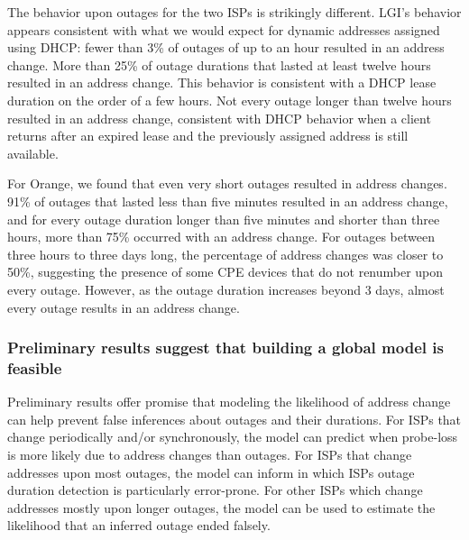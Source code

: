 The behavior upon outages for the two ISPs is strikingly
different. LGI's behavior appears consistent with what we would 
expect for dynamic addresses assigned using DHCP: fewer than
3\% of outages of up to an hour resulted in an address
change.  More than 25\% of outage
durations that lasted at least twelve hours resulted in an address
change. This behavior is consistent with a DHCP lease duration on the
order of a few hours.  Not every outage longer than twelve
hours resulted in an address change, consistent with DHCP 
behavior when a client returns after an expired lease and the
previously assigned address
is still available.

For Orange, we found that even very short outages resulted in
address changes. 91\% of outages that lasted less than five
minutes resulted in an address change, and for every outage duration
longer than five minutes and shorter than three hours, more than 75\% occurred with an
address change. For outages between three hours to three days
long, the percentage of address changes was closer to 50\%, suggesting
the presence of some CPE devices that do not renumber upon every outage. However, as the
outage duration increases beyond 3 days, almost every outage results
in an address change.


\subsubsection*{Preliminary results suggest that building a global
  model is feasible}

Preliminary results offer promise that modeling the likelihood of
address change can help prevent false inferences about outages and
their durations. For ISPs that change periodically and/or synchronously, the model can
predict when probe-loss is more likely due to
address changes than outages. For ISPs that change addresses upon most
outages, the model can inform in which ISPs outage duration detection
is particularly error-prone. For other ISPs which change addresses
mostly upon longer outages, the model can be used to estimate the
likelihood that an inferred outage ended falsely.

